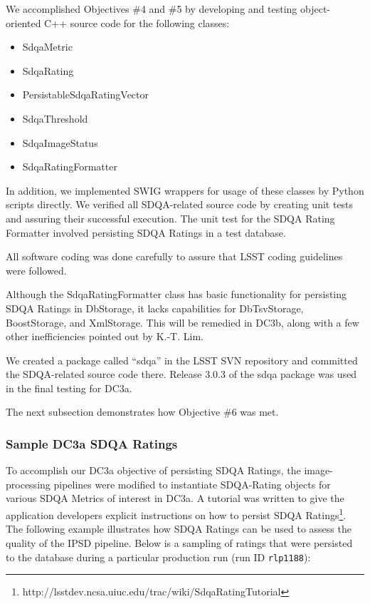 We accomplished Objectives \#4 and \#5 by developing and testing object-oriented C++
source code for the following classes:

\begin{itemize}
\item{SdqaMetric}
\item{SdqaRating}
\item{PersistableSdqaRatingVector}
\item{SdqaThreshold}
\item{SdqaImageStatus}
\item{SdqaRatingFormatter}
\end{itemize}

\noindent
In addition, we implemented SWIG wrappers for usage of these classes by Python scripts
directly.  We verified all SDQA-related source code by creating unit tests and assuring
their successful execution.  The unit test for the SDQA Rating Formatter involved 
persisting SDQA Ratings in a test database.  

All software coding was done carefully to assure that LSST coding guidelines were followed.

Although the SdqaRatingFormatter class has basic functionality for persisting SDQA Ratings
in DbStorage, it lacks capabilities for DbTsvStorage, BoostStorage, and XmlStorage.  This
will be remedied in DC3b, along with a few other inefficiencies pointed out by K.-T. Lim.

We created a package called ``sdqa'' in the LSST SVN repository and committed the SDQA-related source code there.  Release 3.0.3 of the sdqa package was used in the 
final testing for DC3a.

The next subsection demonstrates how Objective \#6 was met.


\subsubsection{Sample DC3a SDQA Ratings}

To accomplish our DC3a objective of persisting SDQA Ratings, the
image-processing pipelines were modified to instantiate SDQA-Rating
objects for various SDQA Metrics of interest in DC3a.  A tutorial was
written to give the application developers explicit instructions on
how to persist SDQA
Ratings\footnote{http://lsstdev.ncsa.uiuc.edu/trac/wiki/SdqaRatingTutorial}.
The following example illustrates how SDQA Ratings can be used to
assess the quality of the IPSD pipeline.   Below is a sampling of
ratings that were persisted to the database during a particular
production run (run ID {\tt rlp1188}):

